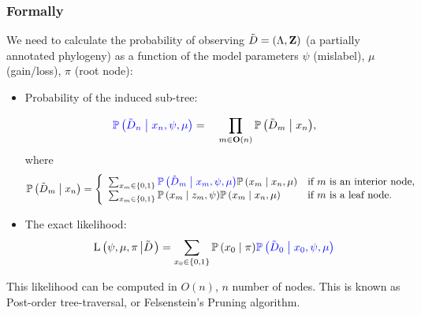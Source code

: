 \documentclass[aspectratio=169, 9pt]{beamer}\usepackage[]{graphicx}\usepackage[]{color}
\begin{document}
\begin{frame}[label=math]
\frametitle{Formally}

\small

We need to calculate the probability of observing $\tilde {D{}}{} = (\Lambda{}, \mathbf{Z}{})$ (a partially annotated phylogeny) as a function of the model parameters $\psi$ (mislabel), $\mu$ (gain/loss), $\pi$ (root node):

\begin{itemize}
\item Probability of the induced sub-tree:

\begin{equation} 
\label{eq:interior1}
{\color{blue}\Prcond{\aphyloObs_n}{\ann{n}, \psi, \mu}} =  \quad\prod_{m \in \offspring{n}} \Prcond{\aphyloObs_{m}}{\ann{n}},
\end{equation}
where
\begin{equation*}
\Prcond{\aphyloObs_{m}}{\ann{n}} = \left\{\begin{array}{ll}
	\sum_{\ann{m}\in\{0,1\}}{\color{blue}\Prcond{\aphyloObs_m}{\ann{m}, \psi, \mu}}\Prcond{\ann{m}}{\ann{n}, \mu} & \mbox{if $m$ is an interior node,} \\
	\sum_{\ann{m}\in\{0,1\}}\Prcond{\ann{m}}{\annObs{m}, \psi}
	\Prcond{\ann{m}}{\ann{n}, \mu} & \mbox{if $m$ is a leaf node.}
	\end{array}
	\right.
\end{equation*}

\item The exact likelihood:
\begin{equation}
\label{eq:ll}
\Likelihood{\psi, \mu, \pi}{\aphyloObs} =
\sum_{\ann{0} \in \{0,1\}} \Prcond{\ann{0}}{\pi} {\color{blue}\Prcond{\aphyloObs_0}{\ann{0},\psi,\mu}}
\end{equation}

\end{itemize}

This likelihood can be computed in $O(n)$, $n$ number of nodes. This is known as Post-order tree-traversal, or Felsenstein's Pruning algorithm.

\normalsize
\end{frame}


\end{document}
